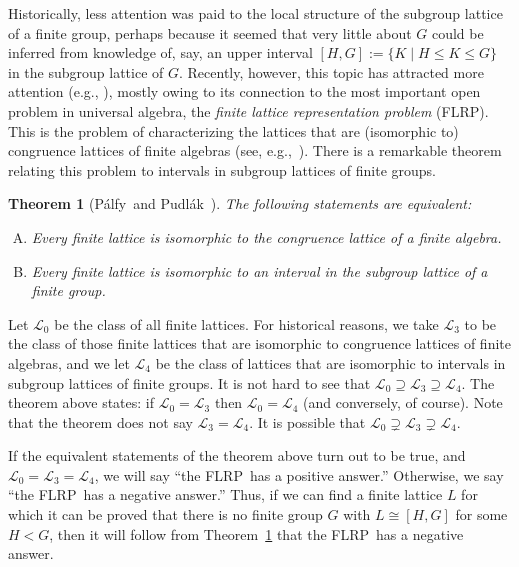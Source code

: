 \documentclass[11pt]{amsart}
\theoremstyle{plain}
\newtheorem{theorem}{Theorem}[section]
\theoremstyle{definition}
\theoremstyle{remark}
\numberwithin{theorem}{section}
\numberwithin{claim}{section}
\numberwithin{equation}{section}
\numberwithin{conjecture}{section}
\newcommand{\Palfy}{P\'alfy}
\newcommand{\Pudlak}{Pudl\'ak}
\newcommand{\<}{\ensuremath{\langle}}
\renewcommand{\>}{\ensuremath{\rangle}}
\renewcommand{\leq}{\ensuremath{\leqslant}}
\newcommand{\FLRP}{{\small FLRP}}
\newcommand{\0}{\ensuremath{\mathbf{0}}}
\newcommand{\1}{\ensuremath{\mathbf{1}}}
\newcommand{\2}{\ensuremath{\mathbf{2}}}
\newcommand{\3}{\ensuremath{\mathbf{3}}}
\newcommand{\4}{\ensuremath{\mathbf{4}}}
\newcommand{\5}{\ensuremath{\mathbf{5}}}
\newcommand{\sL}{\ensuremath{\mathscr{L}}}
\begin{document}
Historically, less attention was paid to the local structure of the
subgroup lattice of a finite group, perhaps because it seemed that very little
about $G$ could be inferred from knowledge of, say, an upper
  interval $[H,G] := \{K \mid H\leq K \leq G\}$ in the subgroup lattice of $G$.
Recently, however, this topic has attracted more attention (e.g.,
\cite{Aschbacher:2009,Basile:2001,Borner:1999,Kohler:1983,Lucchini:1994a,Palfy:1988}),
mostly owing to its connection to the most important open problem in
universal algebra,
the \emph{finite lattice representation problem} (\FLRP). This is the problem of
characterizing the lattices that are (isomorphic to) congruence lattices of
finite algebras (see, e.g.,~\cite{Berman:1970,DeMeo:thesis,Palfy:1995,Palfy:2001}). 
There is a remarkable theorem relating this problem to intervals in subgroup
lattices of finite groups. 
\begin{theorem}[\Palfy\ and \Pudlak~\cite{Palfy:1980}]
\label{thm:P5}
The following statements are equivalent:
\begin{enumerate}[(A)]
\item Every finite lattice is isomorphic to
  the congruence lattice of a finite algebra.
\item Every finite lattice is isomorphic to
  an interval in the subgroup lattice of a finite group.
\end{enumerate}
\end{theorem}
Let $\sL_0$ be the class of all finite lattices.  For historical reasons, we
take $\sL_3$ to be the class of those finite lattices that are isomorphic
to congruence lattices of finite algebras, and we let $\sL_4$ be the class of
lattices that are isomorphic to intervals in subgroup lattices of finite groups.
It is not hard to see that $\sL_0 \supseteq \sL_3 \supseteq \sL_4$.  The theorem
above states: if $\sL_0 = \sL_3$ then 
$\sL_0= \sL_4$ (and conversely, of course).  Note that the theorem does not say $\sL_3 = \sL_4$.
It is possible that $\sL_0 \supsetneq \sL_3 \supsetneq \sL_4$.

If the equivalent statements of the theorem above turn out to be true, and
$\sL_0=\sL_3=\sL_4$, we will say ``the \FLRP\ has a positive answer.''
Otherwise, we say ``the \FLRP\ has a negative answer.'' Thus, if we can find a finite lattice $L$ for which it can be
proved that there is no finite group $G$ with $L \cong [H,G]$ for some $H< G$,
then it will follow from Theorem~\ref{thm:P5} that the \FLRP\ has a negative answer.
\end{document}
